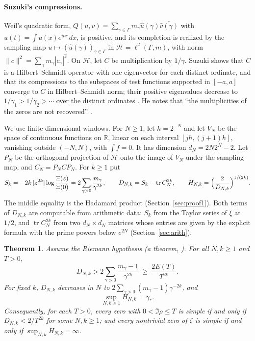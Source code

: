 \documentclass[11pt,a4paper]{article}
\theoremstyle{plain}
\newtheorem{theorem}{Theorem}
\theoremstyle{remark}
\DeclareMathOperator{\tr}{tr}
\newcommand{\R}{\mathbb R}
\newcommand{\Hs}{\mathcal H}
\begin{document}
\paragraph{Suzuki's compressions.}
Weil's quadratic form, $Q(u,v)=\sum_{\gamma\in\Gamma}m_\gamma\widehat u(\gamma)\overline{\widehat v(\gamma)}$ with
$\widehat u(t)=\int u(x)e^{itx}\,dx$, is positive, and its completion is realized by the sampling map
$u\mapsto(\widehat u(\gamma))_{\gamma\in\Gamma}$ in $\Hs=\ell^2(\Gamma,m)$, with norm
$\|c\|^2=\sum_\gamma m_\gamma|c_\gamma|^2$. On $\Hs$, let $C$ be multiplication by $1/\gamma$. Suzuki
\cite[§2.3 and (4.1)]{suzuki} shows that $C$ is a Hilbert--Schmidt operator with one eigenvector for each distinct
ordinate, and that its compressions to the subspaces of test functions supported in $[-a,a]$ converge to $C$ in
Hilbert--Schmidt norm; their positive eigenvalues decrease to $1/\gamma_1>1/\gamma_2>\cdots$ over the distinct
ordinates \cite[Theorem~1.1]{suzuki}. He notes that ``the multiplicities of the zeros are not recovered''
\cite[§1, after Theorem~1.2]{suzuki}.

We use finite-dimensional windows. For $N\ge1$, let $h=2^{-N}$ and let $V_N$ be the space of continuous functions on
$\R$, linear on each interval $[jh,(j+1)h]$, vanishing outside $(-N,N)$, with $\int f=0$. It has dimension
$d_N=2N2^N-2$. Let $P_N$ be the orthogonal projection of $\Hs$ onto the image of $V_N$ under the sampling map, and
$C_N=P_NCP_N$. For $k\ge1$ put
\[
 S_k=-2k\,[z^{2k}]\log\frac{\Xi(z)}{\Xi(0)}=2\sum_{\gamma>0}\frac{m_\gamma}{\gamma^{2k}},\qquad
 D_{N,k}=S_k-\tr C_N^{2k},\qquad H_{N,k}=\Bigl(\frac2{D_{N,k}}\Bigr)^{1/(2k)} .
\]
The middle equality is the Hadamard product (Section~\ref{sec:proof1}). Both terms of $D_{N,k}$ are computable from
arithmetic data: $S_k$ from the Taylor series of $\xi$ at $1/2$, and $\tr C_N^{2k}$ from two $d_N\times d_N$
matrices whose entries are given by the explicit formula with the prime powers below $e^{2N}$
(Section~\ref{sec:arith}).

\begin{theorem}\label{thm:main}
Assume the Riemann hypothesis (a theorem, \cite{alpoge}). For all $N,k\ge1$ and $T>0$,
\[
 D_{N,k}>2\sum_{\gamma>0}\frac{m_\gamma-1}{\gamma^{2k}}\ \ge\ \frac{2E(T)}{T^{2k}} .
\]
For fixed $k$, $D_{N,k}$ decreases in $N$ to $2\sum_{\gamma>0}(m_\gamma-1)\gamma^{-2k}$, and
\[
 \sup_{N,k\ge1}H_{N,k}=\gamma_* .
\]
Consequently, for each $T>0$, every zero with $0<\Im\rho\le T$ is simple if and only if $D_{N,k}<2/T^{2k}$ for some
$N,k\ge1$; and every nontrivial zero of $\zeta$ is simple if and only if $\sup_{N,k}H_{N,k}=\infty$.
\end{theorem}
\end{document}
